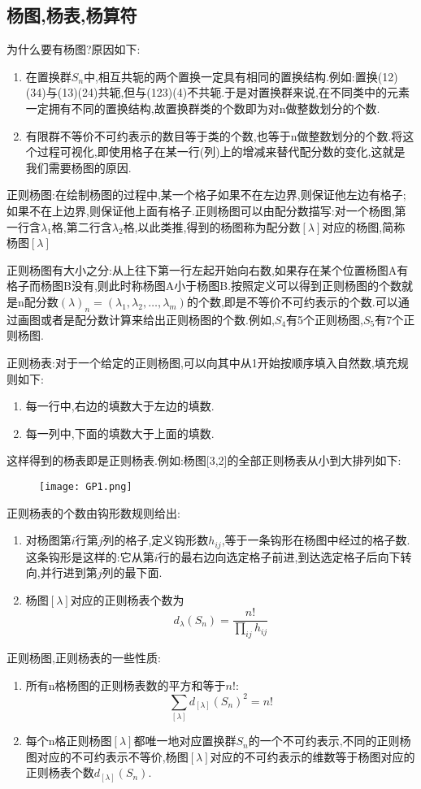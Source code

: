 \documentclass{ctexart}
\begin{document}
\subsection{杨图,杨表,杨算符}

为什么要有杨图?原因如下:
\begin{enumerate}
    \item 在置换群$S_{n}$中,相互共轭的两个置换一定具有相同的置换结构.例如:置换(12)(34)与(13)(24)共轭,但与(123)(4)不共轭.于是对置换群来说,在不同类中的元素一定拥有不同的置换结构,故置换群类的个数即为对n做整数划分的个数.
    \item 有限群不等价不可约表示的数目等于类的个数,也等于n做整数划分的个数.将这个过程可视化,即使用格子在某一行(列)上的增减来替代配分数的变化,这就是我们需要杨图的原因.
\end{enumerate}

\noindent 正则杨图:在绘制杨图的过程中,某一个格子如果不在左边界,则保证他左边有格子;如果不在上边界,则保证他上面有格子.正则杨图可以由配分数描写:对一个杨图,第一行含$\lambda_{1}$格,第二行含$\lambda_{2}$格,以此类推,得到的杨图称为配分数$[\lambda]$对应的杨图,简称杨图$[\lambda]$\medskip

正则杨图有大小之分:从上往下第一行左起开始向右数,如果存在某个位置杨图A有格子而杨图B没有,则此时称杨图A小于杨图B.按照定义可以得到正则杨图的个数就是n配分数$(\lambda)_{n}=(\lambda_{1},\lambda_{2},\ldots,\lambda_{m})$的个数,即是不等价不可约表示的个数.可以通过画图或者是配分数计算来给出正则杨图的个数.例如,$S_{4}$有5个正则杨图,$S_{5}$有7个正则杨图.\medskip

\noindent 正则杨表:对于一个给定的正则杨图,可以向其中从1开始按顺序填入自然数,填充规则如下:
\begin{enumerate}
    \item 每一行中,右边的填数大于左边的填数.
    \item 每一列中,下面的填数大于上面的填数.
\end{enumerate}
这样得到的杨表即是正则杨表.例如:杨图[3,2]的全部正则杨表从小到大排列如下:
\begin{figure}[H]
    \centering
    \texttt{[image: GP1.png]}
\end{figure}
正则杨表的个数由钩形数规则给出:
\begin{enumerate}
    \item 对杨图第$i$行第$j$列的格子,定义钩形数$h_{ij}$,等于一条钩形在杨图中经过的格子数.这条钩形是这样的:它从第$i$行的最右边向选定格子前进,到达选定格子后向下转向,并行进到第$j$列的最下面.
    \item 杨图$[\lambda]$对应的正则杨表个数为\[d_{\lambda}(S_{n})=\frac{n!}{\prod_{ij}h_{ij}}\]
\end{enumerate}
正则杨图,正则杨表的一些性质:
\begin{enumerate}
    \item 所有n格杨图的正则杨表数的平方和等于$n!$:\[\sum_{[\lambda]}d_{[\lambda]}(S_{n})^{2}=n!\]
    \item 每个n格正则杨图$[\lambda]$都唯一地对应置换群$S_{n}$的一个不可约表示,不同的正则杨图对应的不可约表示不等价,杨图$[\lambda]$对应的不可约表示的维数等于杨图对应的正则杨表个数$d_{[\lambda]}(S_{n})$.
\end{enumerate}
\end{document}
